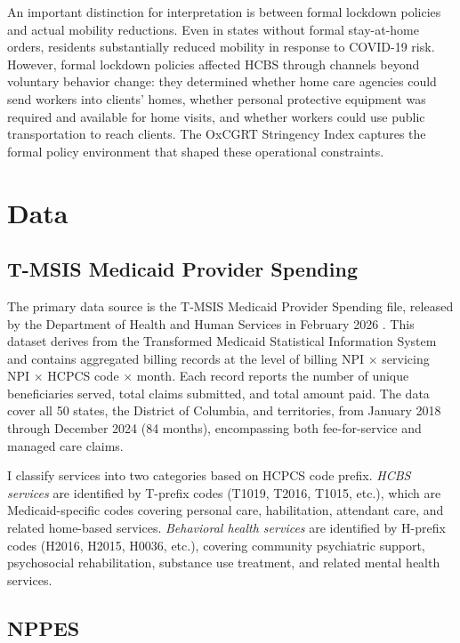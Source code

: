 \documentclass[12pt]{article}
\begin{document}
An important distinction for interpretation is between formal lockdown policies and actual mobility reductions. Even in states without formal stay-at-home orders, residents substantially reduced mobility in response to COVID-19 risk. However, formal lockdown policies affected HCBS through channels beyond voluntary behavior change: they determined whether home care agencies could send workers into clients' homes, whether personal protective equipment was required and available for home visits, and whether workers could use public transportation to reach clients. The OxCGRT Stringency Index captures the formal policy environment that shaped these operational constraints.


\section{Data}

\subsection{T-MSIS Medicaid Provider Spending}

The primary data source is the T-MSIS Medicaid Provider Spending file, released by the Department of Health and Human Services in February 2026 \citep{hhs2026tmsis}. This dataset derives from the Transformed Medicaid Statistical Information System and contains aggregated billing records at the level of billing NPI $\times$ servicing NPI $\times$ HCPCS code $\times$ month. Each record reports the number of unique beneficiaries served, total claims submitted, and total amount paid. The data cover all 50 states, the District of Columbia, and territories, from January 2018 through December 2024 (84 months), encompassing both fee-for-service and managed care claims.

I classify services into two categories based on HCPCS code prefix. \textit{HCBS services} are identified by T-prefix codes (T1019, T2016, T1015, etc.), which are Medicaid-specific codes covering personal care, habilitation, attendant care, and related home-based services. \textit{Behavioral health services} are identified by H-prefix codes (H2016, H2015, H0036, etc.), covering community psychiatric support, psychosocial rehabilitation, substance use treatment, and related mental health services.

\subsection{NPPES}
\end{document}
